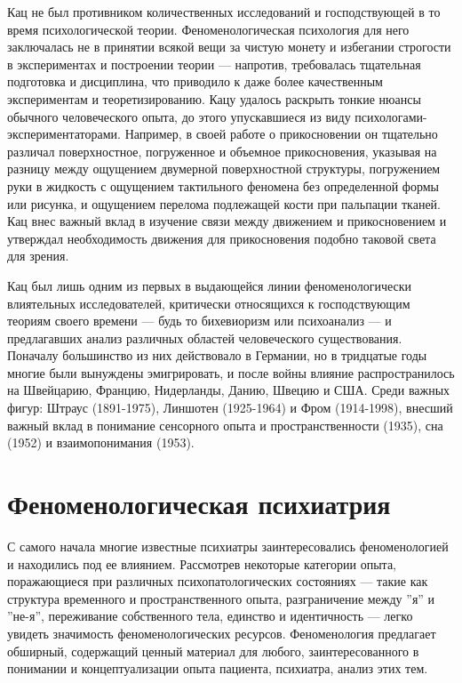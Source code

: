 \documentclass[11pt]{book}
\begin{document}
\relax
{}\relax
\smallskip

Кац не был противником количественных исследований и господствующей в то время психологической теории. Феноменологическая психология для него заключалась не в принятии всякой вещи за чистую монету и избегании строгости в экспериментах и построении теории --- напротив, требовалась тщательная подготовка и дисциплина, что приводило к даже более качественным экспериментам и теоретизированию. Кацу удалось раскрыть тонкие нюансы обычного человеческого опыта, до этого упускавшиеся из виду психологами-экспериментаторами. Например, в своей работе о прикосновении он тщательно различал поверхностное, погруженное и объемное прикосновения, указывая на разницу между ощущением двумерной поверхностной структуры, погружением руки в жидкость с ощущением тактильного феномена без определенной формы или рисунка, и ощущением перелома подлежащей кости при пальпации тканей. Кац внес важный вклад в изучение связи между движением и прикосновением и утверждал необходимость движения для прикосновения подобно таковой света для зрения.

Кац был лишь одним из первых в выдающейся линии феноменологически влиятельных исследователей, критически относящихся к господствующим теориям своего времени --- будь то бихевиоризм или психоанализ --- и предлагавших анализ различных областей человеческого существования. Поначалу большинство из них действовало в Германии, но в тридцатые годы многие были вынуждены эмигрировать, и после войны влияние распространилось на Швейцарию, Францию, Нидерланды, Данию, Швецию и США. Среди важных фигур: Штраус (1891-1975), Линшотен (1925-1964) и Фром (1914-1998), внесший важный вклад в понимание сенсорного опыта и пространственности (1935), сна (1952) и взаимопонимания (1953).

\section{Феноменологическая психиатрия}

С самого начала многие известные психиатры заинтересовались феноменологией и находились под ее влиянием. Рассмотрев некоторые категории опыта, поражающиеся при различных психопатологических состояниях --- такие как структура временного и пространственного опыта, разграничение между ''я'' и ''не-я'', переживание собственного тела, единство и идентичность --- легко увидеть значимость феноменологических ресурсов. Феноменология предлагает обширный, содержащий ценный материал для любого, заинтересованного в понимании и концептуализации опыта пациента, психиатра, анализ этих тем.
\end{document}
